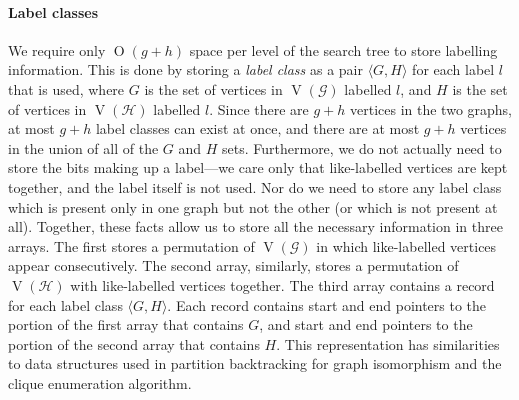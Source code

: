 \documentclass[letterpaper]{article}
\newcommand{\citet}[1]{\citeauthor{#1} \shortcite{#1}}
\newcommand{\citep}[1]{\cite{#1}}
\newcommand{\graphG}{\mathcal{G}}
\newcommand{\graphH}{\mathcal{H}}
\newcommand{\setG}{G}
\newcommand{\setH}{H}
\DeclareMathOperator{\V}{V}
\newcommand{\BigO}[1]{\ensuremath{\operatorname{O}\left(#1\right)}}
\begin{document}
\paragraph{Label classes} We require only $\BigO{g+h}$ space per level of the
search tree to store labelling information.  This is done by storing a
\emph{label class} as a pair $\langle \setG,\setH \rangle$ for each label $l$ that is
used, where $\setG$ is the set of vertices in $\V(\graphG)$ labelled $l$, and $\setH$ is the
set of vertices in $\V(\graphH)$ labelled $l$. Since there are $g + h$ vertices in the two graphs, at most
$g + h$ label classes can exist at once, and there are at most $g + h$ vertices
in the union of all of the $\setG$ and $\setH$ sets. Furthermore, we do not actually
need to store the bits making up a label---we care only that like-labelled
vertices are kept together, and the label itself is not used. Nor do we need to
store any label class which is present only in one graph but not the other (or
which is not present at all).  Together, these facts allow us to store all the
necessary information in three arrays.  The first 
stores a permutation of $\V(\graphG)$ in which like-labelled vertices appear
consecutively.  The second array, similarly, stores a permutation
of $\V(\graphH)$ with like-labelled vertices together.  The third array
contains a record for each label class $\langle \setG,\setH \rangle$.  Each
record contains start and end pointers to the portion of the first
array that contains $\setG$, and start and end pointers to the portion
of the second array that contains $\setH$.  This representation has
similarities to data structures used in partition backtracking for graph isomorphism
\citep{DBLP:conf/wea/Lopez-PresaA09,DBLP:journals/jsc/McKayP14} and the \citet{DBLP:journals/cacm/BronK73}
clique enumeration algorithm.
\end{document}
